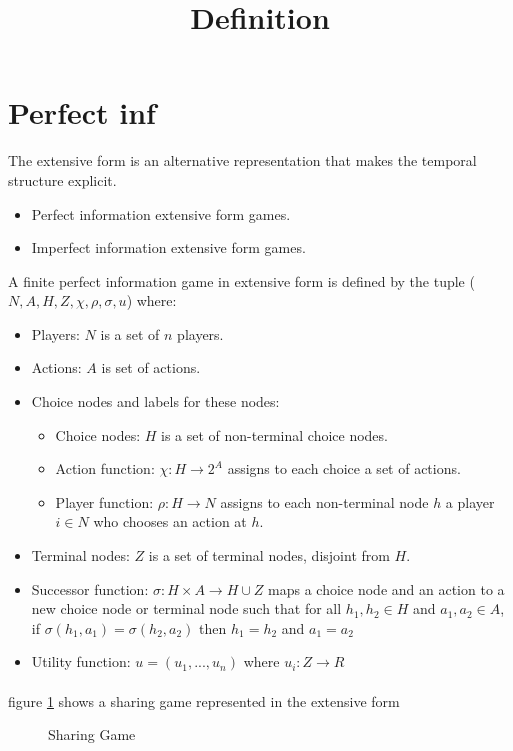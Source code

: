 \section{Perfect inf}{The extensive form is an alternative representation that makes the temporal structure explicit.}
\begin{itemize}
\item{Perfect information extensive form games.}
\item{Imperfect information extensive form games.}
\end{itemize}
\title {\textbf{Definition}} A finite perfect information game in extensive form is defined by the tuple ($N, A, H, Z,\chi ,\rho, \sigma, u $)
where:
\begin{itemize}
\item{Players: $N$ is a set of $n$ players.}
\item{Actions: $A$ is set of actions.}
\item{Choice nodes and labels for these nodes: }
\begin{itemize}
\item{Choice nodes: $H$ is a set of non-terminal choice nodes.}
\item{Action function: $\chi : H \to 2^A $ assigns to each choice a set of actions.}
\item{Player function: $\rho : H \to N$ assigns to each non-terminal node $h$ a player $i \in N$ who chooses an action at $h$.}
\end{itemize}
\item{Terminal nodes: $Z$ is a set of terminal nodes, disjoint from $H$.}
\item{Successor function: $\sigma : H \times A \to H \cup Z$ maps a choice node and an action to a new choice node or terminal node such that for all $h_1, h_2 \in H$ and $a_1, a_2 \in A$, if $\sigma(h_1, a_1) = \sigma(h_2, a_2)$ then $h_1  = h_2$  and $a_1 = a_2$} 
\item{Utility function: $u = (u_1,...,u_n)$ where $u_i : Z \to R$
}
\end{itemize} 
\paragraph{}figure \ref{fig:scaled_diss} shows a sharing game represented in the extensive form
\begin{figure}[h]
 
  \centering
  \caption{Sharing Game\label{fig:scaled_diss}}
\end{figure}
